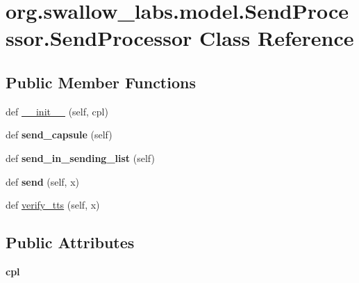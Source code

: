 \hypertarget{classorg_1_1swallow__labs_1_1model_1_1_send_processor_1_1_send_processor}{}\section{org.\+swallow\+\_\+labs.\+model.\+Send\+Processor.\+Send\+Processor Class Reference}
\label{classorg_1_1swallow__labs_1_1model_1_1_send_processor_1_1_send_processor}
\subsection*{Public Member Functions}
\begin{DoxyCompactItemize}
\item 
def \hyperlink{classorg_1_1swallow__labs_1_1model_1_1_send_processor_1_1_send_processor_a3223e15e06460bd73c2abe033763745d}{\+\_\+\+\_\+init\+\_\+\+\_\+} (self, cpl)
\item 
\hypertarget{classorg_1_1swallow__labs_1_1model_1_1_send_processor_1_1_send_processor_ac794285da2ca76c310f7ed27b0f228a6}{}def {\bfseries send\+\_\+capsule} (self)\label{classorg_1_1swallow__labs_1_1model_1_1_send_processor_1_1_send_processor_ac794285da2ca76c310f7ed27b0f228a6}

\item 
\hypertarget{classorg_1_1swallow__labs_1_1model_1_1_send_processor_1_1_send_processor_ad263d6ed95f8ebcd55b21ea850bbe6e9}{}def {\bfseries send\+\_\+in\+\_\+sending\+\_\+list} (self)\label{classorg_1_1swallow__labs_1_1model_1_1_send_processor_1_1_send_processor_ad263d6ed95f8ebcd55b21ea850bbe6e9}

\item 
\hypertarget{classorg_1_1swallow__labs_1_1model_1_1_send_processor_1_1_send_processor_a6d7e3460b7808a402800e744085748c3}{}def {\bfseries send} (self, x)\label{classorg_1_1swallow__labs_1_1model_1_1_send_processor_1_1_send_processor_a6d7e3460b7808a402800e744085748c3}

\item 
def \hyperlink{classorg_1_1swallow__labs_1_1model_1_1_send_processor_1_1_send_processor_aa43751ca953005ca14b5c786618e37b7}{verify\+\_\+tts} (self, x)
\end{DoxyCompactItemize}
\subsection*{Public Attributes}
\begin{DoxyCompactItemize}
\item 
\hypertarget{classorg_1_1swallow__labs_1_1model_1_1_send_processor_1_1_send_processor_a714da88a1a056af3ca3e5d399f5220b4}{}{\bfseries cpl}\label{classorg_1_1swallow__labs_1_1model_1_1_send_processor_1_1_send_processor_a714da88a1a056af3ca3e5d399f5220b4}

\end{DoxyCompactItemize}

